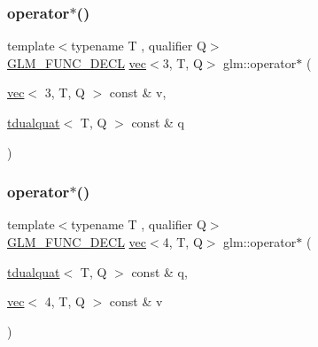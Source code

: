 \mbox{\label{group__gtx__dual__quaternion_ga84dc00cb210525a28d3a185c9a0ba176}} 
\subsubsection{\texorpdfstring{operator$\ast$()}{operator*()}\hspace{0.1cm}{\footnotesize\ttfamily [3/7]}}
{\footnotesize\ttfamily template$<$typename T , qualifier Q$>$ \\
\mbox{\hyperlink{setup_8hpp_ab2d052de21a70539923e9bcbf6e83a51}{G\+L\+M\+\_\+\+F\+U\+N\+C\+\_\+\+D\+E\+CL}} \mbox{\hyperlink{structglm_1_1vec}{vec}}$<$3, T, Q$>$ glm\+::operator$\ast$ (\begin{DoxyParamCaption}\item[{\mbox{\hyperlink{structglm_1_1vec}{vec}}$<$ 3, T, Q $>$ const \&}]{v,  }\item[{\mbox{\hyperlink{structglm_1_1tdualquat}{tdualquat}}$<$ T, Q $>$ const \&}]{q }\end{DoxyParamCaption})}

\mbox{\label{group__gtx__dual__quaternion_ga5e415497e00977106ec263f86b61e84c}} 
\subsubsection{\texorpdfstring{operator$\ast$()}{operator*()}\hspace{0.1cm}{\footnotesize\ttfamily [4/7]}}
{\footnotesize\ttfamily template$<$typename T , qualifier Q$>$ \\
\mbox{\hyperlink{setup_8hpp_ab2d052de21a70539923e9bcbf6e83a51}{G\+L\+M\+\_\+\+F\+U\+N\+C\+\_\+\+D\+E\+CL}} \mbox{\hyperlink{structglm_1_1vec}{vec}}$<$4, T, Q$>$ glm\+::operator$\ast$ (\begin{DoxyParamCaption}\item[{\mbox{\hyperlink{structglm_1_1tdualquat}{tdualquat}}$<$ T, Q $>$ const \&}]{q,  }\item[{\mbox{\hyperlink{structglm_1_1vec}{vec}}$<$ 4, T, Q $>$ const \&}]{v }\end{DoxyParamCaption})}

